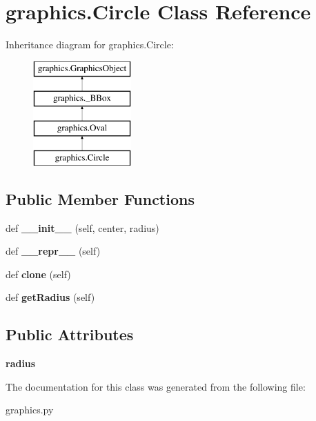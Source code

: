 \hypertarget{classgraphics_1_1_circle}{}\section{graphics.\+Circle Class Reference}
\label{classgraphics_1_1_circle}
Inheritance diagram for graphics.\+Circle\+:\begin{figure}[H]
\begin{center}
\leavevmode
\includegraphics[height=4.000000cm]{classgraphics_1_1_circle}
\end{center}
\end{figure}
\subsection*{Public Member Functions}
\begin{DoxyCompactItemize}
\item 
def {\bfseries \+\_\+\+\_\+init\+\_\+\+\_\+} (self, center, radius)\hypertarget{classgraphics_1_1_circle_adf9ab62e2d952cf52cfecba9acfd5660}{}\label{classgraphics_1_1_circle_adf9ab62e2d952cf52cfecba9acfd5660}

\item 
def {\bfseries \+\_\+\+\_\+repr\+\_\+\+\_\+} (self)\hypertarget{classgraphics_1_1_circle_a7acb1acc63613799ff2724cb05d75750}{}\label{classgraphics_1_1_circle_a7acb1acc63613799ff2724cb05d75750}

\item 
def {\bfseries clone} (self)\hypertarget{classgraphics_1_1_circle_ae575b71c63ce889e4c872c792d748f7b}{}\label{classgraphics_1_1_circle_ae575b71c63ce889e4c872c792d748f7b}

\item 
def {\bfseries get\+Radius} (self)\hypertarget{classgraphics_1_1_circle_a420b2e69c4d116c094dc6bd6b1e81839}{}\label{classgraphics_1_1_circle_a420b2e69c4d116c094dc6bd6b1e81839}

\end{DoxyCompactItemize}
\subsection*{Public Attributes}
\begin{DoxyCompactItemize}
\item 
{\bfseries radius}\hypertarget{classgraphics_1_1_circle_aacc54bd0a94edd646405c8718cbeb47c}{}\label{classgraphics_1_1_circle_aacc54bd0a94edd646405c8718cbeb47c}

\end{DoxyCompactItemize}


The documentation for this class was generated from the following file\+:\begin{DoxyCompactItemize}
\item 
graphics.\+py\end{DoxyCompactItemize}

